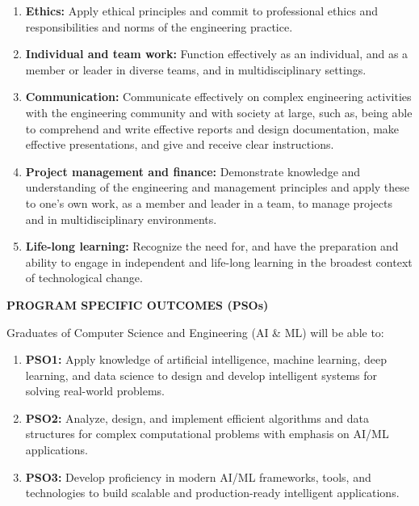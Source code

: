 \begin{enumerate}
    \item \textbf{Ethics:} Apply ethical principles and commit to professional ethics and responsibilities and norms of the engineering practice.
    
    \item \textbf{Individual and team work:} Function effectively as an individual, and as a member or leader in diverse teams, and in multidisciplinary settings.
    
    \item \textbf{Communication:} Communicate effectively on complex engineering activities with the engineering community and with society at large, such as, being able to comprehend and write effective reports and design documentation, make effective presentations, and give and receive clear instructions.
    
    \item \textbf{Project management and finance:} Demonstrate knowledge and understanding of the engineering and management principles and apply these to one's own work, as a member and leader in a team, to manage projects and in multidisciplinary environments.
    
    \item \textbf{Life-long learning:} Recognize the need for, and have the preparation and ability to engage in independent and life-long learning in the broadest context of technological change.
\end{enumerate}

\newpage

\begin{center}
\textbf{\Large PROGRAM SPECIFIC OUTCOMES (PSOs)}
\end{center}

\vspace{0.5cm}

Graduates of Computer Science and Engineering (AI \& ML) will be able to:

\begin{enumerate}
    \item \textbf{PSO1:} Apply knowledge of artificial intelligence, machine learning, deep learning, and data science to design and develop intelligent systems for solving real-world problems.
    
    \item \textbf{PSO2:} Analyze, design, and implement efficient algorithms and data structures for complex computational problems with emphasis on AI/ML applications.
    
    \item \textbf{PSO3:} Develop proficiency in modern AI/ML frameworks, tools, and technologies to build scalable and production-ready intelligent applications.
\end{enumerate}

\newpage
